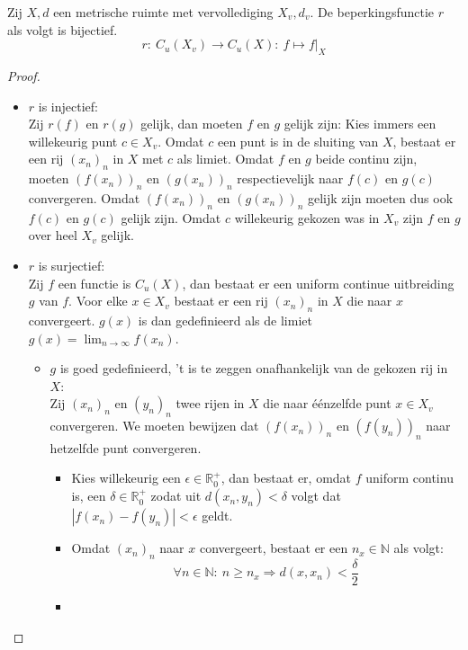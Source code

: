 \documentclass[main.tex]{subfiles}
\begin{document}
\begin{st}
  Zij $X,d$ een metrische ruimte met vervollediging $X_{v},d_{v}$.
  De beperkingsfunctie $r$ als volgt is bijectief.
  \[ r:\ C_{u}(X_{v}) \rightarrow C_{u}(X):\ f \mapsto f|_{X}\]
  
  \begin{proof}
    \noindent
    \begin{itemize}
    \item $r$ is injectief:\\
      Zij $r(f)$ en $r(g)$ gelijk, dan moeten $f$ en $g$ gelijk zijn:
      Kies immers een willekeurig punt $c\in X_{v}$. 
      Omdat $c$ een punt is in de sluiting van $X$, bestaat er een rij $(x_{n})_{n}$ in $X$ met $c$ als limiet.
      Omdat $f$ en $g$ beide continu zijn, moeten $(f(x_{n}))_{n}$ en $(g(x_{n}))_{n}$ respectievelijk naar $f(c)$ en $g(c)$ convergeren.
      Omdat $(f(x_{n}))_{n}$ en $(g(x_{n}))_{n}$ gelijk zijn moeten dus ook $f(c)$ en $g(c)$ gelijk zijn.
      Omdat $c$ willekeurig gekozen was in $X_{v}$ zijn $f$ en $g$ over heel $X_{v}$ gelijk.
    \item $r$ is surjectief:\\
      Zij $f$ een functie is $C_{u}(X)$, dan bestaat er een uniform continue uitbreiding $g$ van $f$.
      Voor elke $x\in X_{v}$ bestaat er een rij $(x_{n})_{n}$ in $X$ die naar $x$ convergeert.
      $g(x)$ is dan gedefinieerd als de limiet $g(x) = \lim_{n\rightarrow \infty}f(x_{n})$.
      \begin{itemize}
      \item $g$ is goed gedefinieerd, 't is te zeggen onafhankelijk van de gekozen rij in $X$:\\
        Zij $(x_{n})_{n}$ en $(y_{n})_{n}$ twee rijen in $X$ die naar \'e\'enzelfde punt $x\in X_{v}$ convergeren.
        We moeten bewijzen dat $(f(x_{n}))_{n}$ en $(f(y_{n}))_{n}$ naar hetzelfde punt convergeren.
        \begin{itemize}
        \item 
          Kies willekeurig een $\epsilon\in\mathbb{R}_{0}^{+}$, dan bestaat er, omdat $f$ uniform continu is, een $\delta\in\mathbb{R}_{0}^{+}$ zodat uit $d(x_{n},y_{n})< \delta$ volgt dat $|f(x_{n})-f(y_{n})|<\epsilon$ geldt.
        \item 
          Omdat $(x_{n})_{n}$ naar $x$ convergeert, bestaat er een $n_{x}\in\mathbb{N}$ als volgt:
          \[ \forall n\in\mathbb{N}:\ n \ge n_{x} \Rightarrow d(x,x_{n}) < \frac{\delta}{2} \]
        \item 

\end{itemize}
\end{itemize}
\end{itemize}
\end{proof}
\end{st}
\end{document}
